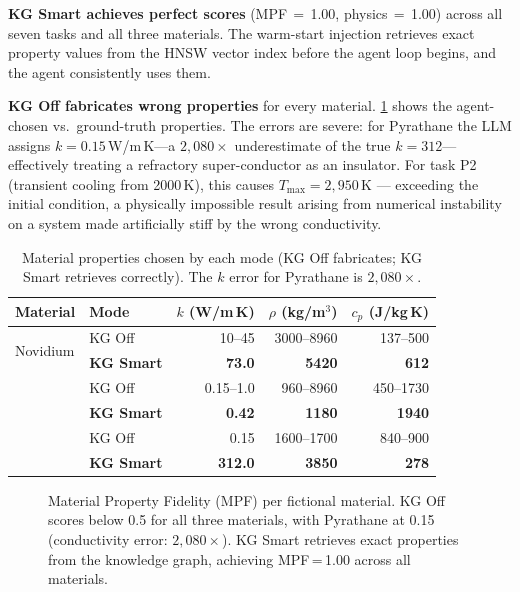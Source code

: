 \documentclass[twocolumn]{article}
\begin{document}
\textbf{KG Smart achieves perfect scores} (MPF$\,{=}\,$1.00, physics$\,{=}\,$1.00)
across all seven tasks and all three materials.  The warm-start injection
retrieves exact property values from the HNSW vector index before the
agent loop begins, and the agent consistently uses them.

\textbf{KG Off fabricates wrong properties} for every material.
\cref{tab:novel-props} shows the agent-chosen vs.\ ground-truth
properties.  The errors are severe: for Pyrathane the LLM assigns
$k{=}0.15$\,W/m\,K---a $2{,}080\times$ underestimate of the true
$k{=}312$---effectively treating a refractory super-conductor as an
insulator.  For task P2 (transient cooling from 2000\,K), this causes
$T_\text{max}{=}2{,}950$\,K --- exceeding the initial condition,
a physically impossible result arising from numerical instability
on a system made artificially stiff by the wrong conductivity.

\begin{table}[htbp]
\centering\footnotesize
\caption{Material properties chosen by each mode (KG Off fabricates;
  KG Smart retrieves correctly).  The $k$ error for Pyrathane is
  $2{,}080\times$.}
\label{tab:novel-props}
\setlength{\tabcolsep}{3pt}
\begin{tabular}{llrrr}
\toprule
Material & Mode & $k$ (W/m\,K) & $\rho$ (kg/m$^3$) & $c_p$ (J/kg\,K) \\
\midrule
\multirow{2}{*}{Novidium}
  & KG Off  & 10--45  & 3000--8960 & 137--500 \\
  & \textbf{KG Smart} & \textbf{73.0} & \textbf{5420} & \textbf{612} \\
\addlinespace
\multirow{2}{*}{Cryonite}
  & KG Off  & 0.15--1.0 & 960--8960 & 450--1730 \\
  & \textbf{KG Smart} & \textbf{0.42} & \textbf{1180} & \textbf{1940} \\
\addlinespace
\multirow{2}{*}{Pyrathane}
  & KG Off  & 0.15  & 1600--1700 & 840--900 \\
  & \textbf{KG Smart} & \textbf{312.0} & \textbf{3850} & \textbf{278} \\
\bottomrule
\end{tabular}
\end{table}

\begin{figure}[htbp]
  \centering
  
  \caption{Material Property Fidelity (MPF) per fictional material.
    KG Off scores below 0.5 for all three materials, with Pyrathane
    at 0.15 (conductivity error: $2{,}080\times$).  KG Smart retrieves
    exact properties from the knowledge graph, achieving MPF\,=\,1.00
    across all materials.}
  \label{fig:mpf}
\end{figure}
\end{document}

